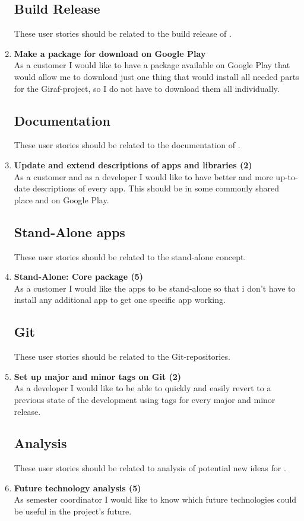 \begin{enumerate}
\subsection{Build Release}
These user stories should be related to the build release of \giraf.

\item \textbf{Make a package for download on Google Play}\\
As a customer I would like to have a package available on Google Play that would allow me to download just one thing that would install all needed parts for the Giraf-project, so I do not have to download them all individually.

\subsection{Documentation}
These user stories should be related to the documentation of \giraf.

\item \textbf{Update and extend descriptions of apps and libraries (2)}\\
As a customer and as a developer I would like to have better and more up-to-date descriptions of every app. This should be in some commonly shared place and on Google Play.

\subsection{Stand-Alone apps}
These user stories should be related to the stand-alone concept.

\item \textbf{Stand-Alone: Core package (5)}\\
As a customer I would like the apps to be stand-alone so that i don't have to install any additional app to get one specific app working.

\subsection{Git}
These user stories should be related to the Git-repositories.

\item \textbf{Set up major and minor tags on Git (2)}\\
As a developer I would like to be able to quickly and easily revert to a previous state of the development using tags for every major and minor release.

\subsection{Analysis}
These user stories should be related to analysis of potential new ideas for \giraf.

\item \textbf{Future technology analysis (5)}\\
As semester coordinator I would like to know which future technologies could be useful in the project’s future.

\end{enumerate}

